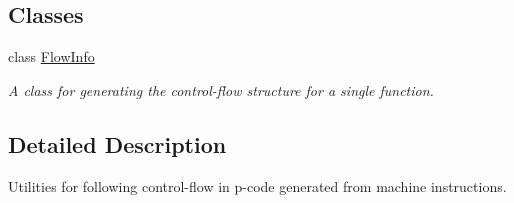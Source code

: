 \subsection*{Classes}
\begin{DoxyCompactItemize}
\item 
class \mbox{\hyperlink{class_flow_info}{Flow\+Info}}
\begin{DoxyCompactList}\small\item\em A class for generating the control-\/flow structure for a single function. \end{DoxyCompactList}\end{DoxyCompactItemize}


\subsection{Detailed Description}
Utilities for following control-\/flow in p-\/code generated from machine instructions. 

